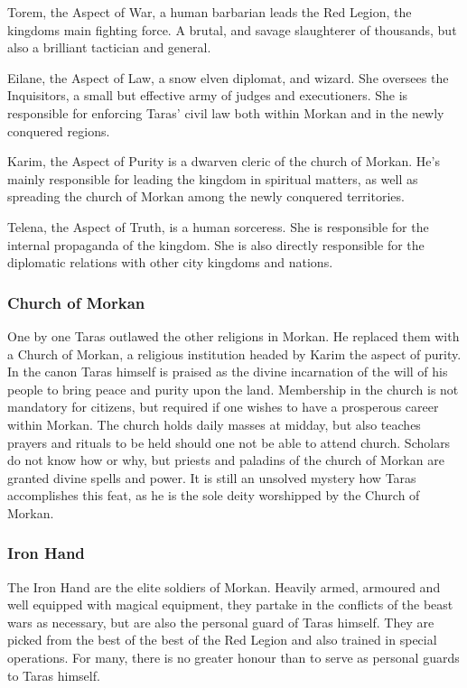 Torem, the Aspect of War, a human barbarian leads the Red Legion, the kingdoms
main fighting force. A brutal, and savage slaughterer of thousands, but also a
brilliant tactician and general.

Eilane, the Aspect of Law, a snow elven diplomat, and wizard. She oversees the
Inquisitors, a small but effective army of judges and executioners. She is
responsible for enforcing Taras' civil law both within Morkan and in the newly
conquered regions.

Karim, the Aspect of Purity is a dwarven cleric of the church of Morkan. He's
mainly responsible for leading the kingdom in spiritual matters, as well as
spreading the church of Morkan among the newly conquered territories.

Telena, the Aspect of Truth, is a human sorceress. She is responsible for the
internal propaganda of the kingdom. She is also directly responsible for the
diplomatic relations with other city kingdoms and nations.

\subsubsection{Church of Morkan}

One by one Taras outlawed the other religions in Morkan. He replaced them with
a Church of Morkan, a religious institution headed by Karim the aspect of
purity. In the canon Taras himself is praised as the divine incarnation of the
will of his people to bring peace and purity upon the land. Membership in the
church is not mandatory for citizens, but required if one wishes to have a
prosperous career within Morkan. The church holds daily masses at midday, but
also teaches prayers and rituals to be held should one not be able to attend
church. Scholars do not know how or why, but priests and paladins of the
church of Morkan are granted divine spells and power. It is still an unsolved
mystery how Taras accomplishes this feat, as he is the sole deity worshipped
by the Church of Morkan.

\subsubsection{Iron Hand}
\label{sec:Iron Hand}

The Iron Hand are the elite soldiers of Morkan. Heavily armed, armoured and
well equipped with magical equipment, they partake in the conflicts of the
beast wars as necessary, but are also the personal guard of Taras
himself. They are picked from the best of the best of the Red Legion and also
trained in special operations. For many, there is no greater honour than to
serve as personal guards to Taras himself.

